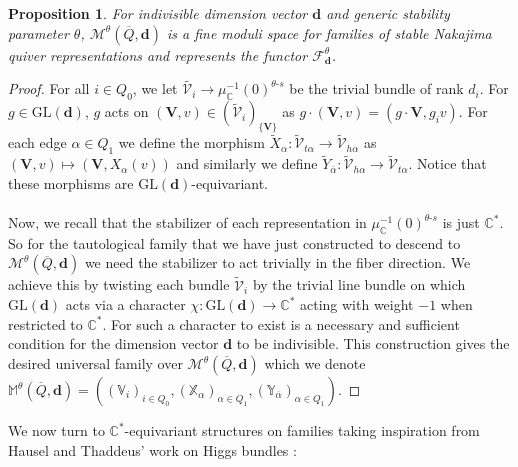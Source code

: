 \documentclass{amsart}
\theoremstyle{plain}
\newtheorem{proposition}[theorem]{Proposition}
\numberwithin{equation}{section}
\theoremstyle{definition}
\theoremstyle{remark}
\begin{document}
	\begin{proposition}\label{existenceUniversalFamilyNakajimaQuiverVarieties}
		For indivisible dimension vector $\mathbf{d}$ and generic stability parameter $\theta$, $\mathcal{M}^{\theta}(\overline{Q},\mathbf{d})$ is a fine moduli space for families of stable Nakajima quiver representations and represents the functor $\mathcal{F}^{\theta}_{\mathbf{d}}$. 
	\end{proposition}
	\begin{proof}
		For all $i\in Q_0$, we let $\widetilde{\mathcal{V}_i}\to \mu^{-1}_{\mathbb{C}}(0)^{\theta\text{-}s}$ be the trivial bundle of rank $d_i$. For $g\in \text{GL}(\mathbf{d})$, $g$ acts on $(\mathbf{V},v)\in (\widetilde{\mathcal{V}}_i)_{\{\mathbf{V}\}}$ as $g\cdot (\mathbf{V},v)=(g\cdot\mathbf{V},g_iv)$. For each edge $\alpha\in Q_1$ we define the morphism $\widetilde{X}_{\alpha}:\widetilde{\mathcal{V}}_{t\alpha}\to \widetilde{\mathcal{V}}_{h\alpha}$ as $(\mathbf{V},v)\mapsto (\mathbf{V},X_{\alpha}(v))$ and similarly we define $\widetilde{Y}_{\overline\alpha}:\widetilde{\mathcal{V}}_{h\alpha}\to \widetilde{\mathcal{V}}_{t\alpha}$. Notice that these morphisms are $\text{GL}(\mathbf{d})$-equivariant. 
		\\
		\\
		Now, we recall that the stabilizer of each representation in $\mu^{-1}_{\mathbb{C}}(0)^{\theta\text{-}s}$ is just $\mathbb{C}^*$. So for the tautological family that we have just constructed to descend to $\mathcal{M}^{\theta}(\overline{Q},\mathbf{d})$ we need the stabilizer to act trivially in the fiber direction. We achieve this by twisting each bundle $\widetilde{\mathcal{V}}_i$ by the trivial line bundle on which $\text{GL}(\mathbf{d})$ acts via a character $\chi:\text{GL}(\mathbf{d})\to \mathbb{C}^*$ acting with weight $-1$ when restricted to $\mathbb{C}^*$. For such a character to exist is a necessary and sufficient condition for the dimension vector $\mathbf{d}$ to be indivisible. This construction gives the desired universal family over $\mathcal{M}^{\theta}(\overline{Q},\mathbf{d})$ which we denote $\mathbb{M}^{\theta}(\overline{Q},\mathbf{d})=((\mathbb{V}_i)_{i\in Q_0},(\mathbb{X}_{\alpha})_{\alpha\in Q_1},(\mathbb{Y}_{\overline\alpha})_{\alpha\in Q_1})$.
	\end{proof}
	We now turn to $\mathbb{C}^*$-equivariant structures on families taking inspiration from Hausel and Thaddeus' work on Higgs bundles \cite[(4.3) and (4.4)]{HauselThaddeus}: 
\end{document}
